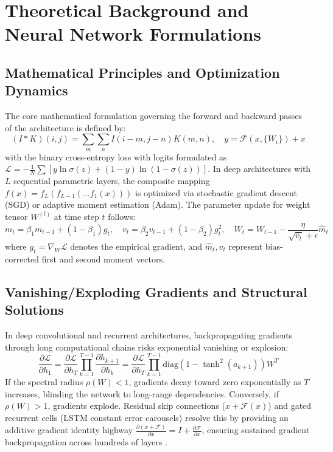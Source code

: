 \section{Theoretical Background and Neural Network Formulations}

\subsection{Mathematical Principles and Optimization Dynamics}
The core mathematical formulation governing the forward and backward passes of the architecture is defined by:
\begin{equation}
  (I * K)(i, j) = \sum_m \sum_n I(i-m, j-n) K(m, n), \quad y = \mathcal{F}(x, \{W_i\}) + x
\label{eq:core_math}
\end{equation}
with the binary cross-entropy loss with logits formulated as $\mathcal{L} = -\frac{1}{N} \sum [y \ln \sigma(z) + (1-y) \ln(1-\sigma(z))]$.
In deep architectures with $L$ sequential parametric layers, the composite mapping $f(x) = f_L(f_{L-1}(\dots f_1(x)))$ is optimized via stochastic gradient descent (SGD) or adaptive moment estimation (Adam). The parameter update for weight tensor $W^{(l)}$ at time step $t$ follows:
\begin{equation}
  m_t = \beta_1 m_{t-1} + (1 - \beta_1) g_t, \quad v_t = \beta_2 v_{t-1} + (1 - \beta_2) g_t^2, \quad W_t = W_{t-1} - \frac{\eta}{\sqrt{\hat{v}_t} + \epsilon} \hat{m}_t
\end{equation}
where $g_t = \nabla_W \mathcal{L}$ denotes the empirical gradient, and $\hat{m}_t, \hat{v}_t$ represent bias-corrected first and second moment vectors.

\subsection{Vanishing/Exploding Gradients and Structural Solutions}
In deep convolutional and recurrent architectures, backpropagating gradients through long computational chains risks exponential vanishing or explosion:
\begin{equation}
  \frac{\partial \mathcal{L}}{\partial h_1} = \frac{\partial \mathcal{L}}{\partial h_T} \prod_{k=1}^{T-1} \frac{\partial h_{k+1}}{\partial h_k} = \frac{\partial \mathcal{L}}{\partial h_T} \prod_{k=1}^{T-1} \text{diag}(1 - \tanh^2(a_{k+1})) W^T
\end{equation}
If the spectral radius $\rho(W) < 1$, gradients decay toward zero exponentially as $T$ increases, blinding the network to long-range dependencies. Conversely, if $\rho(W) > 1$, gradients explode. Residual skip connections ($x + \mathcal{F}(x)$) and gated recurrent cells (LSTM constant error carousels) resolve this by providing an additive gradient identity highway $\frac{\partial (x + \mathcal{F})}{\partial x} = I + \frac{\partial \mathcal{F}}{\partial x}$, ensuring sustained gradient backpropagation across hundreds of layers \cite{he2016deep, hochreiter1997long}.

